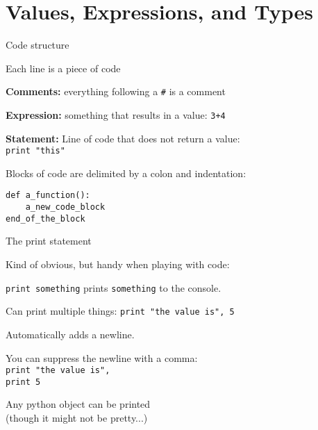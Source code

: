 \documentclass{beamer}
\begin{document}
\section{Values, Expressions, and Types}

\begin{frame}[fragile]{Code structure}

\vfill
{\large Each line is a piece of code}

\vfill
{\large {\bf Comments:} everything following a \verb|#| is a comment}


\vfill
{\large {\bf Expression:} something that results in a value: \verb|3+4|}

\vfill
{\large {\bf Statement:} Line of code that does not return a value: \\
        \verb|print "this"|}

\vfill
{\large Blocks of code are delimited by a colon and indentation:
\begin{verbatim}
def a_function():
    a_new_code_block
end_of_the_block
\end{verbatim}
}

\vfill
\end{frame}

\begin{frame}[fragile]{The print statement}

{\large
Kind of obvious, but handy when playing with code:

\vfill
\verb|print something| prints \verb|something| to the console.

\vfill
Can print multiple things: \verb|print "the value is", 5|

\vfill
Automatically adds a newline.

\vfill
You can suppress the newline with a comma: \\
\verb|print "the value is",|\\
\verb|print 5|

\vfill
Any python object can be printed\\
(though it might not be pretty...)

}

\end{frame}
\end{document}
